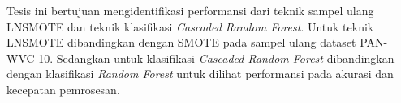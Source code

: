 Tesis ini bertujuan mengidentifikasi performansi dari teknik sampel ulang
LNSMOTE dan teknik klasifikasi
\textit{Cascaded Random Forest}.
Untuk teknik LNSMOTE dibandingkan dengan SMOTE pada sampel ulang dataset
PAN-WVC-10.
Sedangkan untuk klasifikasi
\textit{Cascaded Random Forest}
dibandingkan dengan klasifikasi
\textit{Random Forest}
untuk dilihat performansi pada akurasi dan kecepatan pemrosesan.
